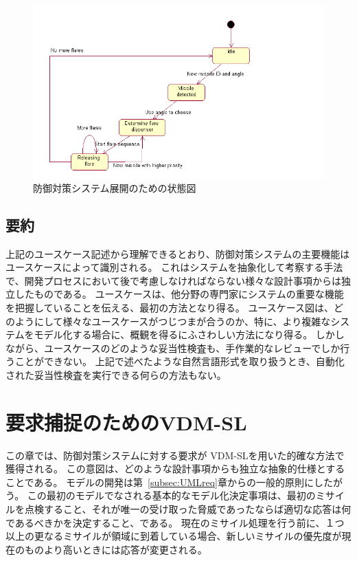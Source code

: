 \documentclass[\pformat,12pt]{jreport}
\begin{document}
\begin{figure}
\begin{center}
\includegraphics[width=\textwidth]{CMstate}
\end{center}
\caption{防御対策システム展開のための状態図\label{fig:counterstate}}
\end{figure}

\subsection{要約}

上記のユースケース記述から理解できるとおり、防御対策システムの主要機能はユースケースによって識別される。
これはシステムを抽象化して考察する手法で、開発プロセスにおいて後で考慮しなければならない様々な設計事項からは独立したものである。
ユースケースは、他分野の専門家にシステムの重要な機能を把握していることを伝える、最初の方法となり得る。
ユースケース図は、どのようにして様々なユースケースがつじつまが合うのか、特に、より複雑なシステムをモデル化する場合に、概観を得るにふさわしい方法になり得る。
しかしながら、ユースケースのどのような妥当性検査も、手作業的なレビューでしか行うことができない。
上記で述べたような自然言語形式を取り扱うとき、自動化された妥当性検査を実行できる何らの方法もない。

\section{要求捕捉のためのVDM-SL}\label{sec:VDMSLreq}\label{sec:VDMSL}

この章では、防御対策システムに対する要求が VDM-SLを用いた的確な方法で獲得される。 
この意図は、どのような設計事項からも独立な抽象的仕様とすることである。
モデルの開発は第~\ref{subsec:UMLreq}章からの一般的原則にしたがう。 
この最初のモデルでなされる基本的なモデル化決定事項は、最初のミサイルを点検すること、それが唯一の受け取った脅威であったならば適切な応答は何であるべきかを決定すること、である。
現在のミサイル処理を行う前に、１つ以上の更なるミサイルが領域に到着している場合、新しいミサイルの優先度が現在のものより高いときには応答が変更される。
\end{document}
